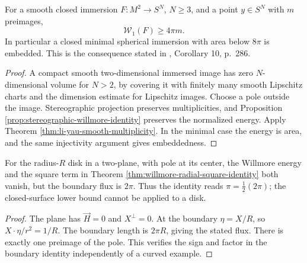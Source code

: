 \begin{corollary}\label{cor:spherical-willmore-multiplicity}
For a smooth closed immersion $F:M^2\to S^N$, $N\geq3$, and a point $y\in S^N$ with $m$ preimages,
\[
 \mathcal W_1(F)\geq4\pi m.
\]
In particular a closed minimal spherical immersion with area below $8\pi$ is embedded. This is the consequence stated in \cite{LY82}, Corollary 10, p.~286.
\end{corollary}
\begin{proof}
A compact smooth two-dimensional immersed image has zero $N$-dimensional volume for $N>2$, by covering it with finitely many smooth Lipschitz charts and the dimension estimate for Lipschitz images. Choose a pole outside the image. Stereographic projection preserves multiplicities, and Proposition \ref{prop:stereographic-willmore-identity} preserves the normalized energy. Apply Theorem \ref{thm:li-yau-smooth-multiplicity}. In the minimal case the energy is area, and the same injectivity argument gives embeddedness.
\end{proof}

\begin{example}\label{ex:willmore-flat-disk-boundary}
For the radius-$R$ disk in a two-plane, with pole at its center, the Willmore energy and the square term in Theorem \ref{thm:willmore-radial-square-identity} both vanish, but the boundary flux is $2\pi$. Thus the identity reads $\pi=\tfrac12(2\pi)$; the closed-surface lower bound cannot be applied to a disk.
\end{example}
\begin{proof}
The plane has $\vec H=0$ and $X^\perp=0$. At the boundary $\eta=X/R$, so $X\cdot\eta/r^2=1/R$. The boundary length is $2\pi R$, giving the stated flux. There is exactly one preimage of the pole. This verifies the sign and factor in the boundary identity independently of a curved example.
\end{proof}

